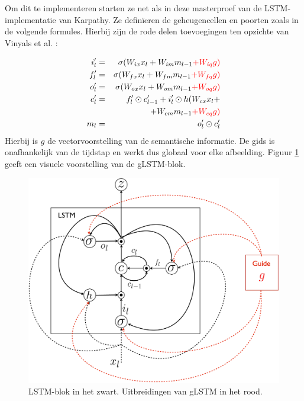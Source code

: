 Om dit te implementeren starten ze net als in deze masterproef van de LSTM-implementatie van Karpathy. Ze defin\"ieren de geheugencellen en poorten zoals in de volgende formules. Hierbij zijn de rode delen toevoegingen ten opzichte van Vinyals et al.\cite{Google} :

%
\begin{eqnarray}
\vspace{-3mm}
\label{glstm-memory-start}
i_l' & = & \sigma (W_{ix} x_l + W_{im} m_{l-1} \color{red}{+ W_{iq} g}) \label{glstm-input} \\
f_l' & = & \sigma (W_{fx} x_l + W_{fm} m_{l-1} \color{red}{+ W_{fq} g}) \\
o_l' & = & \sigma (W_{ox} x_l + W_{om} m_{l-1} \color{red}{+ W_{oq} g}) \\
c_l' & = & f_l' \odot c_{l-1}' + i_l' \odot h(W_{cx} x_l + \nonumber \\
&   & + W_{cm} m_{l-1} \color{red}{+ W_{cq} g}) \\
m_l & = & o_l' \odot c_l'
\label{glstm-memory}
\vspace{-3mm}
\end{eqnarray}
Hierbij is $g$ de vectorvoorstelling van de semantische informatie. De gids is onafhankelijk van de tijdstap en werkt dus globaal voor elke afbeelding. Figuur \ref{fig:glstm} geeft een visuele voorstelling van de gLSTM-blok.

\begin{figure}[tb][h]
	\centering
	\includegraphics[width=\linewidth]{Images/glstm.pdf}
	\caption{LSTM-blok in het zwart. Uitbreidingen van gLSTM in het rood.}
	\label{fig:glstm}
\end{figure}


